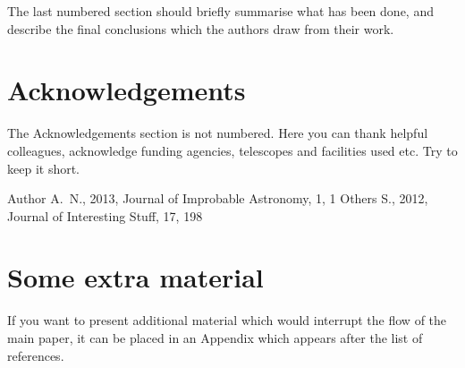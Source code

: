\documentclass[a4paper,fleqn,usenatbib]{mnras}
\begin{document}
The last numbered section should briefly summarise what has been done, and describe
the final conclusions which the authors draw from their work.

\section*{Acknowledgements}

The Acknowledgements section is not numbered. Here you can thank helpful
colleagues, acknowledge funding agencies, telescopes and facilities used etc.
Try to keep it short.




%


\begin{thebibliography}{99}
Author A.~N., 2013, Journal of Improbable Astronomy, 1, 1
Others S., 2012, Journal of Interesting Stuff, 17, 198
\end{thebibliography}



\appendix

\section{Some extra material}

If you want to present additional material which would interrupt the flow of the main paper,
it can be placed in an Appendix which appears after the list of references.



\bsp	%
\label{lastpage}
\end{document}
